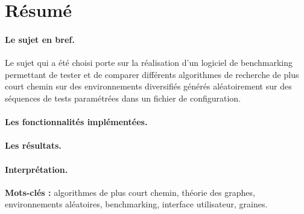 \documentclass[pidr]{tnreport}
\begin{document}
\section*{Résumé}

\paragraph{Le sujet en bref.}
Le sujet qui a été choisi porte sur la réalisation d'un logiciel de benchmarking permettant de tester et de comparer différents algorithmes de recherche de plus court chemin sur des environnements diversifiés générés aléatoirement sur des séquences de tests paramétrées dans un fichier de configuration. \linebreak

\paragraph{Les fonctionnalités implémentées.}

\paragraph{Les résultats.}

\paragraph{Interprétation.}

{\bf Mots-clés :} algorithmes de plus court chemin, théorie des graphes, environnements aléatoires, benchmarking, interface utilisateur, graines.
\end{document}
